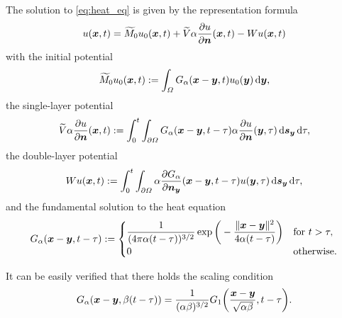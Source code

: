 \documentclass[a4paper,11pt]{article}
\begin{document}
The solution to \eqref{eq:heat_eq} is given by the representation formula
\begin{equation}
  \label{eq:repr}
  u({{\bm{x}}},t) = \widetilde{M}_0 u_0({{\bm{x}}},t) + \widetilde V \alpha\frac{\partial u}{\partial {\ensuremath{{\bm{n}}}}}({{\bm{x}}},t) - Wu({{\bm{x}}},t)
\end{equation}
with the initial potential
\begin{equation*}
  \widetilde{M}_0 u_0({{\bm{x}}},t) := \int_\Omega G_\alpha({{\bm{x}}}-{{\bm{y}}},t) u_0({{\bm{y}}}) \,{\mathrm{d}}{{\bm{y}}},
\end{equation*}
the single-layer potential
\begin{equation*}
  \widetilde V \alpha\frac{\partial u}{\partial {\ensuremath{{\bm{n}}}}} ({{\bm{x}}},t) := \int_0^t \int_{\partial\Omega} G_\alpha({{\bm{x}}}-{{\bm{y}}},t-\tau) \alpha\frac{\partial u}{\partial {\ensuremath{{\bm{n}}}}} ({{\bm{y}}},\tau) \,{\mathrm{d}}{{\bm{s}}}_{{\bm{y}}} \,{\mathrm{d}}\tau,
\end{equation*}
the double-layer potential
\begin{equation*}
  W u ({{\bm{x}}},t) := \int_0^t \int_{\partial\Omega} \alpha\frac{\partial G_\alpha}{\partial {\ensuremath{{\bm{n}}}}_{{\bm{y}}}}({{\bm{x}}}-{{\bm{y}}},t-\tau) u({{\bm{y}}},\tau) \,{\mathrm{d}}{{\bm{s}}}_{{\bm{y}}} \,{\mathrm{d}}\tau,
\end{equation*}
and the fundamental solution to the heat equation
\begin{equation*}
  G_\alpha({{\bm{x}}}-{{\bm{y}}},t-\tau) :=
  \begin{cases}
  \displaystyle
  \frac{1}{(4\pi\alpha(t-\tau))^{3/2}}\exp\bigg( -\frac{\|{{\bm{x}}}-{{\bm{y}}}\|^2}{4\alpha(t-\tau)} \bigg) & \text{for } t > \tau, \\
  0 & \text{otherwise.}
  \end{cases}
\end{equation*}

\begin{remark}
  \label{rem:scaling}
  It can be easily verified that there holds the scaling condition
  \begin{equation}
  \label{eq:G_scaling}
    G_\alpha({{\bm{x}}}-{{\bm{y}}},\beta(t-\tau)) = \frac{1}{(\alpha\beta)^{3/2}} G_1\bigg( \frac{{{\bm{x}}}-{{\bm{y}}}}{\sqrt{\alpha\beta}}, t-\tau \bigg).
  \end{equation}
\end{remark}
\end{document}
